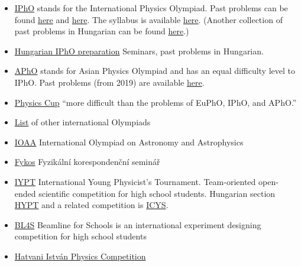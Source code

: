 \documentclass{article}
\begin{document}
\begin{itemize}
\begin{itemize}
\item \href{https://ipho-unofficial.org/}{IPhO} stands for the International Physics Olympiad. Past problems can be found \href{https://physprob.com/}{here} and \href{https://omega4edu.org/physics.html}{here}. The syllabus is available \href{https://www.ipho-new.org/statutes-syllabus/}{here}. (Another collection of past problems in Hungarian can be found  \href{http://ipho.elte.hu/iphos.php}{here}.)

\item \href{https://ipho.physics.bme.hu/}{Hungarian IPhO preparation} Seminars, past problems in Hungarian.

\item \href{http://asianphysicsolympiad.org/}{APhO} stands for Asian Physics Olympiad and has an equal difficulty level to IPhO. Past problems (from 2019) are available \href{https://apho2019.asi.edu.au/resources/past-questions/}{here}.

\item \href{https://physicscup.ee/}{Physics Cup} ``more difficult than the problems of EuPhO, IPhO, and APhO.''

\item \href{http://eik.bme.hu/~vanko/fizika/olimpia.htm}{List} of other international Olympiads

\item \href{http://www.ioaastrophysics.org/}{IOAA} International Olympiad on Astronomy and Astrophysics

\item \href{https://fykos.org/en}{Fykos} Fyzikální korespondenční seminář


\item \href{https://www.iypt.org/}{IYPT} International Young Physicist's Tournament. Team-oriented open-ended scientific competition for high school students. Hungarian section \href{http://hypt.elte.hu/}{HYPT} and a related competition is \href{http://metal.elte.hu/~icys/}{ICYS}.

\item \href{https://beamlineforschools.cern/home}{BL4S} Beamline for Schools is an international experiment designing competition for high school students

\item \href{http://hatvaniverseny.unideb.hu/}{Hatvani István Physics Competition}


\end{itemize}
\end{itemize}
\end{document}
